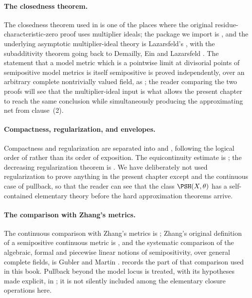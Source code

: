 \paragraph{The closedness theorem.}
The closedness theorem used in
 is one of the places where the original
residue-characteristic-zero proof uses multiplier ideals; the package we
import is \cite[Appendix~B]{BFJ16}, and the underlying asymptotic
multiplier-ideal theory is Lazarsfeld's \cite[Chapter~11]{PAG2}, with the
subadditivity theorem going back to Demailly, Ein and Lazarsfeld
\cite{DEL00}.  The statement that a model metric which is a pointwise limit
at divisorial points of semipositive model metrics is itself semipositive is
proved independently, over an arbitrary complete nontrivially valued field,
as ; the reader comparing the two proofs
will see that the multiplier-ideal input is what allows the present chapter
to reach the same conclusion while simultaneously producing the
approximating net from clause~(2).

\paragraph{Compactness, regularization, and envelopes.}
Compactness and
regularization are separated into  and
, following the logical order of
\cite[Sections~6--8]{BFJ16} rather than its order of exposition.  The
equicontinuity estimate  is
\cite[Theorem~6.1]{BFJ16}; the decreasing regularization theorem
 is \cite[Theorem~8.5]{BFJ16}.  We
have deliberately not used regularization to prove anything in the present
chapter except  and the continuous case of
pullback, so that the reader can see that the class \(\PSH(X,\theta)\) has a
self-contained elementary theory before the hard approximation theorems
arrive.

\paragraph{The comparison with Zhang's metrics.}
The continuous comparison with Zhang's metrics
is \cite[Corollary~8.8]{BFJ16}; Zhang's original definition of a
semipositive continuous metric is \cite{Zhang1995}, and the systematic
comparison of the algebraic, formal and piecewise linear notions of
semipositivity, over general complete fields, is Gubler and Martin
\cite{GM19}.   records the part of that
comparison used in this book.  Pullback beyond the model locus is treated,
with its hypotheses made explicit, in ; it is
not silently included among the elementary closure operations here.

